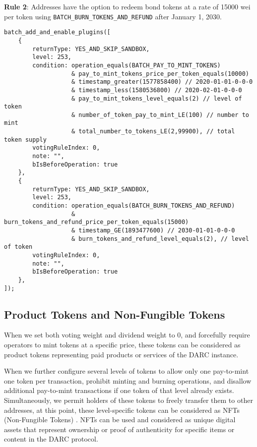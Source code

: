 \documentclass[main.tex]{subfiles}
\begin{document}
\textbf{Rule 2}: Addresses have the option to redeem bond tokens at a rate of 15000 wei per token using \texttt{BATCH\_BURN\_TOKENS\_AND\_REFUND} after January 1, 2030.

\begin{verbatim}
batch_add_and_enable_plugins([
    {
        returnType: YES_AND_SKIP_SANDBOX,
        level: 253, 
        condition: operation_equals(BATCH_PAY_TO_MINT_TOKENS)
                   & pay_to_mint_tokens_price_per_token_equals(10000)
                   & timestamp_greater(1577858400) // 2020-01-01-0-0-0
                   & timestamp_less(1580536800) // 2020-02-01-0-0-0
                   & pay_to_mint_tokens_level_equals(2) // level of token
                   & number_of_token_pay_to_mint_LE(100) // number to mint
                   & total_number_to_tokens_LE(2,99900), // total token supply
        votingRuleIndex: 0, 
        note: "",
        bIsBeforeOperation: true  
    },
    {
        returnType: YES_AND_SKIP_SANDBOX,
        level: 253, 
        condition: operation_equals(BATCH_BURN_TOKENS_AND_REFUND)
                   & burn_tokens_and_refund_price_per_token_equals(15000)
                   & timestamp_GE(1893477600) // 2030-01-01-0-0-0
                   & burn_tokens_and_refund_level_equals(2), // level of token
        votingRuleIndex: 0, 
        note: "",
        bIsBeforeOperation: true  
    },
]);
\end{verbatim}

\subsection{Product Tokens and Non-Fungible Tokens}

When we set both voting weight and dividend weight to 0, and forcefully require operators to mint tokens at a specific price, these tokens can be considered as product tokens representing paid products or services of the DARC instance.

When we further configure several levels of tokens to allow only one pay-to-mint one token per transaction, prohibit minting and burning operations, and disallow additional pay-to-mint transactions if one token of that level already exists. Simultaneously, we permit holders of these tokens to freely transfer them to other addresses, at this point, these level-specific tokens can be considered as NFTs (Non-Fungible Tokens) \cite{ethereumERC721NonFungible}. NFTs can be used and considered as unique digital assets that represent ownership or proof of authenticity for specific items or content in the DARC protocol.
\end{document}
